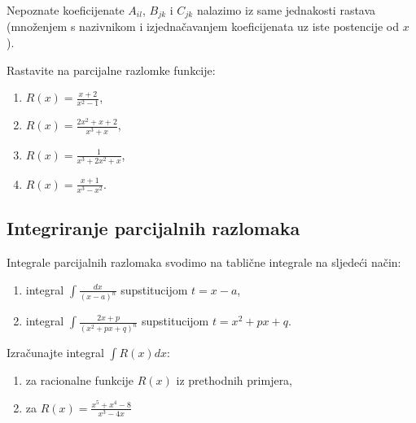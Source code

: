 Nepoznate koeficijenate $A_{il}$, $B_{jk}$ i $C_{jk}$ nalazimo iz same
jednakosti rastava (množenjem s nazivnikom i izjednačavanjem koeficijenata uz
iste postencije od $x$).

\begin{example}
    Rastavite na parcijalne razlomke funkcije:
    \begin{enumerate}
        \item $R(x)=\frac{x+2}{x^2-1}$,
        \item $R(x)=\frac{2x^2+x+2}{x^3+x}$,
        \item $R(x)=\frac{1}{x^3+2x^2+x}$,
        \item $R(x)=\frac{x+1}{x^3-x^2}$.
    \end{enumerate}
\end{example}

\subsection{Integriranje parcijalnih razlomaka}

Integrale parcijalnih razlomaka svodimo na tablične integrale na sljedeći način:

\begin{enumerate}
    \item integral $\int \frac{dx}{(x-a)^n}$ supstitucijom $t=x-a$,
    \item integral $\int \frac{2x+p}{(x^2+px+q)^n}$ supstitucijom $t=x^2+px+q$.
\end{enumerate}

\begin{example}
    Izračunajte integral $\int R(x) dx$:
    \begin{enumerate}
        \item za racionalne funkcije $R(x)$ iz prethodnih primjera,
        \item za $R(x) = \frac{x^5+x^4-8}{x^3-4x}$
    \end{enumerate}
\end{example}
